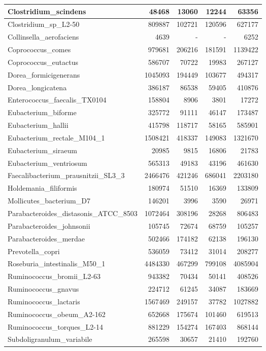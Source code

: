 \documentclass[12pt,a4paper]{article}
\begin{document}
\begin{table}[ht]
\begin{center}
\begin{tabular}{|l*{4}{|r}|}
Clostridium\_scindens & 48468 & 13060 & 12244 & 63356 \\ \hline
Clostridium\_sp\_L2-50 & 809887 & 102721 & 120596 & 627177 \\ \hline
Collinsella\_aerofaciens & 4639 & - & - & 6252 \\ \hline
Coprococcus\_comes & 979681 & 206216 & 181591 & 1139422 \\ \hline
Coprococcus\_eutactus & 586707 & 70722 & 19983 & 267127 \\ \hline
Dorea\_formicigenerans & 1045093 & 194449 & 103677 & 494317 \\ \hline
Dorea\_longicatena & 386187 & 86538 & 59405 & 410876 \\ \hline
Enterococcus\_faecalis\_TX0104 & 158804 & 8906 & 3801 & 17272 \\ \hline
Eubacterium\_biforme & 325772 & 91111 & 46147 & 173487 \\ \hline
Eubacterium\_hallii & 415798 & 118717 & 58165 & 585901 \\ \hline
Eubacterium\_rectale\_M104\_1 & 1508421 & 418337 & 149083 & 1321670 \\ \hline
Eubacterium\_siraeum & 20985 & 9815 & 16806 & 21783 \\ \hline
Eubacterium\_ventriosum & 565313 & 49183 & 43196 & 461630 \\ \hline
Faecalibacterium\_prausnitzii\_SL3\_3 & 2466476 & 421246 & 686041 & 2203180 \\ \hline
Holdemania\_filiformis & 180974 & 51510 & 16369 & 133809 \\ \hline
Mollicutes\_bacterium\_D7 & 146201 & 3996 & 3590 & 26971 \\ \hline
Parabacteroides\_distasonis\_ATCC\_8503 & 1072464 & 308196 & 28268 & 806483 \\ \hline
Parabacteroides\_johnsonii & 105745 & 72674 & 68759 & 105257 \\ \hline
Parabacteroides\_merdae & 502466 & 174182 & 62138 & 196130 \\ \hline
Prevotella\_copri & 536059 & 73412 & 31014 & 208277 \\ \hline
Roseburia\_intestinalis\_M50\_1 & 4484330 & 467299 & 799108 & 4085904 \\ \hline
Ruminococcus\_bromii\_L2-63 & 943382 & 70434 & 50141 & 408526 \\ \hline
Ruminococcus\_gnavus & 224712 & 61245 & 34087 & 183669 \\ \hline
Ruminococcus\_lactaris & 1567469 & 249157 & 37782 & 1027882 \\ \hline
Ruminococcus\_obeum\_A2-162 & 652668 & 175674 & 101460 & 619513 \\ \hline
Ruminococcus\_torques\_L2-14 & 881229 & 154274 & 167403 & 868144 \\ \hline
Subdoligranulum\_variabile & 265598 & 30657 & 21410 & 192760 \\ \hline
\end{tabular}
\end{center}
\end{table}
\end{document}
